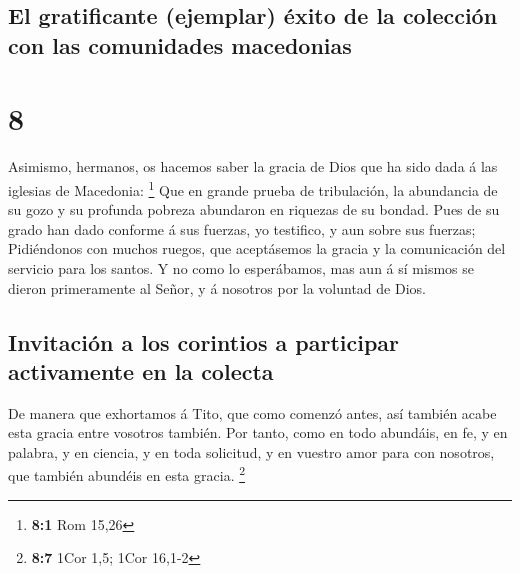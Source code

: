 \hypertarget{el-gratificante-ejemplar-uxe9xito-de-la-colecciuxf3n-con-las-comunidades-macedonias}{%
\subsection{El gratificante (ejemplar) éxito de la colección con las
comunidades
macedonias}\label{el-gratificante-ejemplar-uxe9xito-de-la-colecciuxf3n-con-las-comunidades-macedonias}}

\hypertarget{section-7}{%
\section{8}\label{section-7}}

 Asimismo, hermanos, os hacemos saber la gracia de Dios
que ha sido dada á las iglesias de Macedonia: \footnote{\textbf{8:1} Rom
  15,26}  Que en grande prueba de tribulación, la
abundancia de su gozo y su profunda pobreza abundaron en riquezas de su
bondad.  Pues de su grado han dado conforme á sus fuerzas,
yo testifico, y aun sobre sus fuerzas;  Pidiéndonos con
muchos ruegos, que aceptásemos la gracia y la comunicación del servicio
para los santos.  Y no como lo esperábamos, mas aun á sí
mismos se dieron primeramente al Señor, y á nosotros por la voluntad de
Dios.

\hypertarget{invitaciuxf3n-a-los-corintios-a-participar-activamente-en-la-colecta}{%
\subsection{Invitación a los corintios a participar activamente en la
colecta}\label{invitaciuxf3n-a-los-corintios-a-participar-activamente-en-la-colecta}}

 De manera que exhortamos á Tito, que como comenzó antes,
así también acabe esta gracia entre vosotros también.  Por
tanto, como en todo abundáis, en fe, y en palabra, y en ciencia, y en
toda solicitud, y en vuestro amor para con nosotros, que también
abundéis en esta gracia. \footnote{\textbf{8:7} 1Cor 1,5; 1Cor 16,1-2}

